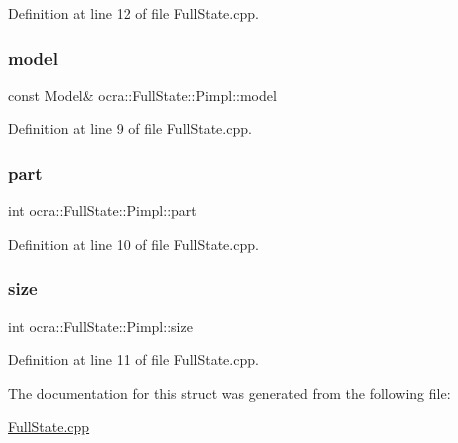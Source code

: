 Definition at line 12 of file Full\+State.\+cpp.

\hypertarget{structocra_1_1FullState_1_1Pimpl_ac8e2409d7e4a099fdb6fc3ef9c7d3026}{}\label{structocra_1_1FullState_1_1Pimpl_ac8e2409d7e4a099fdb6fc3ef9c7d3026} 
\subsubsection{\texorpdfstring{model}{model}}
{\footnotesize\ttfamily const Model\& ocra\+::\+Full\+State\+::\+Pimpl\+::model}



Definition at line 9 of file Full\+State.\+cpp.

\hypertarget{structocra_1_1FullState_1_1Pimpl_ab10f6e199d008d84731024cb80772a5d}{}\label{structocra_1_1FullState_1_1Pimpl_ab10f6e199d008d84731024cb80772a5d} 
\subsubsection{\texorpdfstring{part}{part}}
{\footnotesize\ttfamily int ocra\+::\+Full\+State\+::\+Pimpl\+::part}



Definition at line 10 of file Full\+State.\+cpp.

\hypertarget{structocra_1_1FullState_1_1Pimpl_a5deca911251aa5b774b3cf7f3f6bd5d4}{}\label{structocra_1_1FullState_1_1Pimpl_a5deca911251aa5b774b3cf7f3f6bd5d4} 
\subsubsection{\texorpdfstring{size}{size}}
{\footnotesize\ttfamily int ocra\+::\+Full\+State\+::\+Pimpl\+::size}



Definition at line 11 of file Full\+State.\+cpp.



The documentation for this struct was generated from the following file\+:\begin{DoxyCompactItemize}
\item 
\hyperlink{FullState_8cpp}{Full\+State.\+cpp}\end{DoxyCompactItemize}
